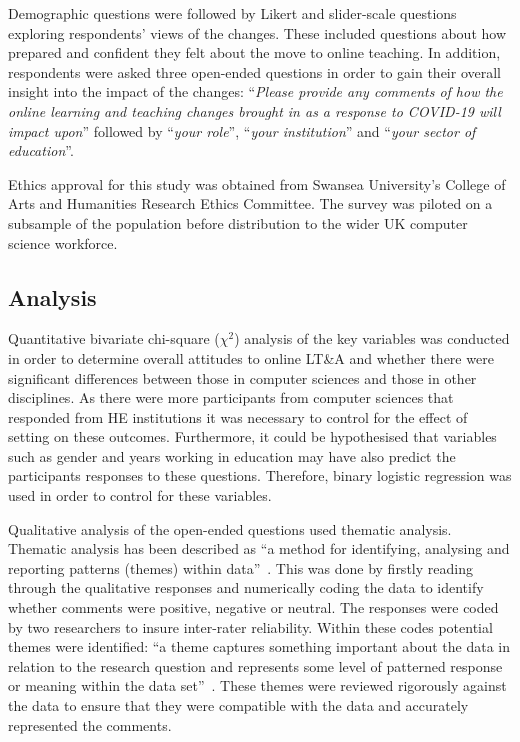 \documentclass[sigconf]{acmart}
\begin{document}
Demographic questions were followed by Likert and slider-scale
questions exploring respondents' views of the changes. These included
questions about how prepared and confident they felt about the move to
online teaching. In addition, respondents were asked three open-ended questions in
order to gain their overall insight into the impact of the changes:
``{\emph{Please provide any comments of how the online learning and
teaching changes brought in as a response to COVID-19 will impact
upon}}'' followed by ``{\emph{your role}}'', ``{\emph{your
institution}}'' and ``{\emph{your sector of education}}''.

Ethics approval for this study was obtained from Swansea University's
College of Arts and Humanities Research Ethics Committee. The survey
was piloted on a subsample of the population before distribution to
the wider UK computer science workforce.

\subsection{Analysis}

Quantitative bivariate chi-square ($\chi^2$) analysis of the key variables
was conducted in order to determine overall attitudes to online LT\&A
and whether there were significant differences between those in
computer sciences and those in other disciplines.  As there were more
participants from computer sciences that responded from HE
institutions it was necessary to control for the effect of setting on
these outcomes. Furthermore, it could be hypothesised that variables
such as gender and years working in education may have also predict
the participants responses to these questions. Therefore, binary
logistic regression was used in order to control for these variables.

Qualitative analysis of the open-ended questions used thematic
analysis. Thematic analysis has been described as ``a method for
identifying, analysing and reporting patterns (themes) within
data''~\cite[p.78]{braun+clarke:2006}. This was done by firstly reading
through the qualitative responses and numerically coding the data to
identify whether comments were positive, negative or neutral. The
responses were coded by two researchers to insure inter-rater
reliability. Within these codes potential themes were identified: ``a
theme captures something important about the data in relation to the
research question and represents some level of patterned response or
meaning within the data set''~\cite[p.82]{braun+clarke:2006}. These
themes were reviewed rigorously against the data to ensure that they
were compatible with the data and accurately represented the comments. 
\end{document}
